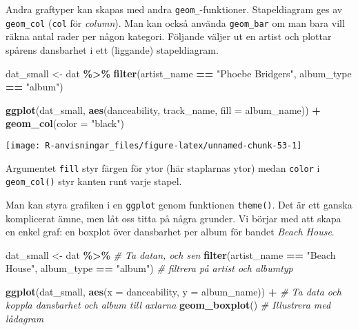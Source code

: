 \documentclass[
]{book}
\newenvironment{Shaded}{\begin{snugshade}}{\end{snugshade}}
\newcommand{\AttributeTok}[1]{\textcolor[rgb]{0.13,0.29,0.53}{#1}}
\newcommand{\CommentTok}[1]{\textcolor[rgb]{0.56,0.35,0.01}{\textit{#1}}}
\newcommand{\FunctionTok}[1]{\textcolor[rgb]{0.13,0.29,0.53}{\textbf{#1}}}
\newcommand{\NormalTok}[1]{#1}
\newcommand{\OtherTok}[1]{\textcolor[rgb]{0.56,0.35,0.01}{#1}}
\newcommand{\SpecialCharTok}[1]{\textcolor[rgb]{0.81,0.36,0.00}{\textbf{#1}}}
\newcommand{\StringTok}[1]{\textcolor[rgb]{0.31,0.60,0.02}{#1}}
\theoremstyle{definition}
\theoremstyle{definition}
\theoremstyle{definition}
\theoremstyle{definition}
\theoremstyle{remark}
\begin{document}
Andra graftyper kan skapas med andra \texttt{geom\_}-funktioner. Stapeldiagram ges av \texttt{geom\_col} (\texttt{col} för \emph{column}). Man kan också använda \texttt{geom\_bar} om man bara vill räkna antal rader per någon kategori.
Följande väljer ut en artist och plottar spårens dansbarhet i ett (liggande) stapeldiagram.

\begin{Shaded}
\begin{Highlighting}[]
\NormalTok{dat\_small }\OtherTok{\textless{}{-}}\NormalTok{ dat }\SpecialCharTok{\%\textgreater{}\%} 
  \FunctionTok{filter}\NormalTok{(artist\_name }\SpecialCharTok{==} \StringTok{"Phoebe Bridgers"}\NormalTok{, album\_type }\SpecialCharTok{==} \StringTok{"album"}\NormalTok{)}

\FunctionTok{ggplot}\NormalTok{(dat\_small, }\FunctionTok{aes}\NormalTok{(danceability, track\_name, }\AttributeTok{fill =}\NormalTok{ album\_name)) }\SpecialCharTok{+}
  \FunctionTok{geom\_col}\NormalTok{(}\AttributeTok{color =} \StringTok{"black"}\NormalTok{)}
\end{Highlighting}
\end{Shaded}

\begin{center}\texttt{[image: R-anvisningar\_files/figure-latex/unnamed-chunk-53-1]} \end{center}

Argumentet \texttt{fill} styr färgen för ytor (här staplarnas ytor) medan \texttt{color} i \texttt{geom\_col()} styr kanten runt varje stapel.

Man kan styra grafiken i en \texttt{ggplot} genom funktionen \texttt{theme()}. Det är ett ganska komplicerat ämne, men låt oss titta på några grunder. Vi börjar med att skapa en enkel graf: en boxplot över dansbarhet per album för bandet \emph{Beach House}.

\begin{Shaded}
\begin{Highlighting}[]
\NormalTok{dat\_small }\OtherTok{\textless{}{-}}\NormalTok{ dat }\SpecialCharTok{\%\textgreater{}\%}                                            \CommentTok{\# Ta datan, och sen}
  \FunctionTok{filter}\NormalTok{(artist\_name }\SpecialCharTok{==} \StringTok{"Beach House"}\NormalTok{, album\_type }\SpecialCharTok{==} \StringTok{"album"}\NormalTok{)   }\CommentTok{\# filtrera på artist och albumtyp}

\FunctionTok{ggplot}\NormalTok{(dat\_small, }\FunctionTok{aes}\NormalTok{(}\AttributeTok{x =}\NormalTok{ danceability, }\AttributeTok{y =}\NormalTok{ album\_name)) }\SpecialCharTok{+}      \CommentTok{\# Ta data och koppla dansbarhet och album till axlarna}
  \FunctionTok{geom\_boxplot}\NormalTok{()                                                }\CommentTok{\# Illustrera med lådagram}
\end{Highlighting}
\end{Shaded}
\end{document}
